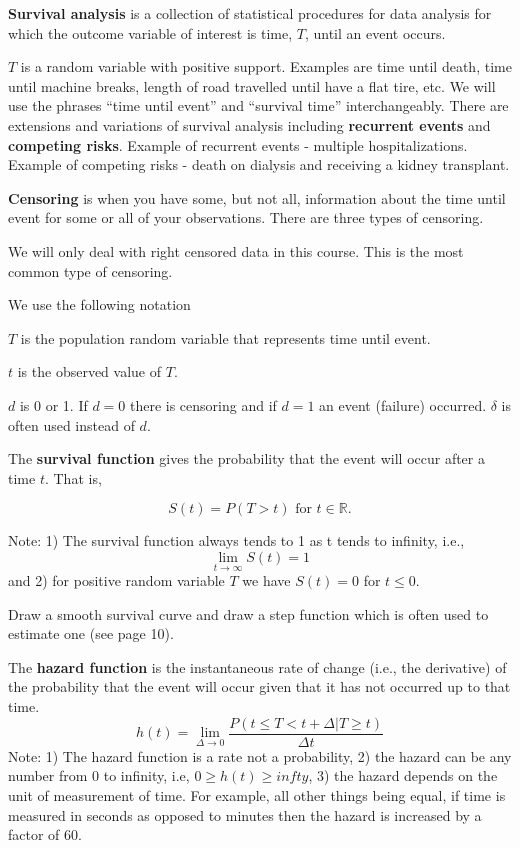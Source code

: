 \documentclass{article}
\begin{document}

 \textbf{Survival analysis} is a collection of statistical procedures for data analysis for which the outcome variable of interest is time, $T$, until an event occurs.

\bn
\im $T$ is a random variable with positive support. Examples are time until death, time until machine breaks, length of road travelled until have a flat tire, etc. We will use the phrases ``time until event'' and ``survival time'' interchangeably.
\im There are extensions and variations of survival analysis including \textbf{recurrent events} and \textbf{competing risks}.
\im Example of recurrent events - multiple hospitalizations. Example of competing risks - death on dialysis and receiving a kidney transplant.
\en

 \textbf{Censoring} is when you have some, but not all, information about the time until event for some or all of your observations. There are three types of censoring.

We will only deal with right censored data in this course. This is the most common type of censoring.


 We use the following notation
\bn
\item $T$ is the population random variable that represents time until event.
\item $t$ is the observed value of $T$.
\item $d$ is 0 or 1. If $d=0$ there is censoring and if $d=1$ an event (failure) occurred. $\delta$ is often used instead of $d$.
\en

 The \textbf{survival function} gives the probability that the event will occur after a time $t$. That is,

\[
S(t) = P(T>t) \text{ for } t \in \mathbb{R}.
\]

Note: 1) The survival function always tends to 1 as t tends to infinity, i.e.,
\[
\lim_{t\rightarrow\infty} S(t) = 1
\]
and 2) for positive random variable $T$ we have $S(t) = 0$ for $t \le 0$.

\NTS Draw a smooth survival curve and draw a step function which is often used to estimate one (see page 10).

 The \textbf{hazard function} is the instantaneous rate of change (i.e., the derivative) of the probability that the event will occur given that it has not occurred up to that time.
\[
h(t) = \lim_{\Delta \rightarrow 0} \frac{P(t \le T < t + \Delta | T \ge t)}{\Delta t}
\]
Note: 1) The hazard function is a rate not a probability, 2) the hazard can be any number from 0 to infinity, i.e, $0\ge h(t) \ge infty$, 3) the hazard depends on the unit of measurement of time. For example, all other things being equal, if time is measured in seconds as opposed to minutes then the hazard is increased by a factor of 60.
\end{document}
